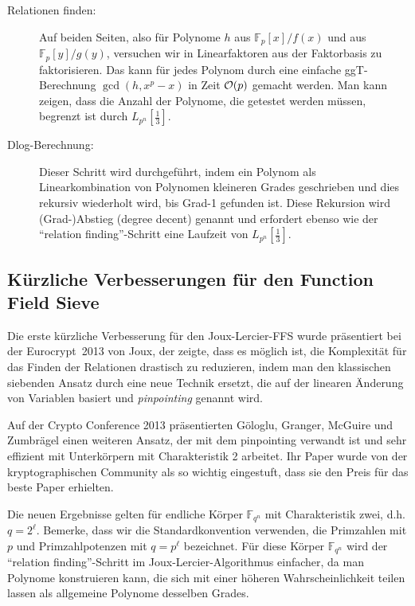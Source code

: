 \begin{refsegment}
\begin{description}
\item[Relationen finden:] Auf beiden Seiten, also für Polynome $h$ aus $\mathbb{F}_p[x]/f(x)$ und aus $\mathbb{F}_p[y]/g(y)$, versuchen wir in Linearfaktoren aus der Faktorbasis zu faktorisieren. Das kann für jedes Polynom durch eine einfache ggT-Berechnung $\gcd(h, x^p-x)$ in Zeit ${\cal O}(p)$ gemacht werden. Man kann zeigen, dass die Anzahl der Polynome, die getestet werden müssen, begrenzt ist durch $L_{p^n}[\frac 1 3]$.
\item[Dlog-Berechnung:] Dieser Schritt wird durchgeführt, indem ein Polynom als Linearkombination von Polynomen kleineren Grades geschrieben und dies rekursiv wiederholt wird, bis Grad-1 gefunden ist. Diese Rekursion wird (Grad-)Abstieg (degree decent) genannt und erfordert ebenso wie der "`relation finding"'-Schritt eine Laufzeit von $L_{p^n}[\frac 1 3]$.
\end{description}


\subsection{Kürzliche Verbesserungen für den Function Field Sieve}
\label{GGMZ}

Die erste kürzliche Verbesserung für den Joux-Lercier-FFS wurde präsentiert bei der Eurocrypt~2013 von Joux, der zeigte, dass es möglich ist, die Komplexität für das Finden der Relationen drastisch zu reduzieren, indem man den klassischen siebenden Ansatz durch eine neue Technik ersetzt, die auf der linearen Änderung von Variablen basiert und {\it pinpointing} genannt wird.

\DIFaddend Auf der Crypto Conference 2013 präsentierten G\"ologlu, Granger, McGuire und Zumbr\"agel einen weiteren Ansatz, der mit dem pinpointing verwandt ist und sehr effizient mit Unterkörpern mit Charakteristik 2 arbeitet. Ihr Paper wurde von der kryptographischen Community als so wichtig eingestuft, dass sie den Preis für das beste Paper erhielten.

Die neuen Ergebnisse gelten für endliche Körper $\mathbb{F}_{q^n}$ mit Charakteristik zwei, d.h. $q=2^{\ell}$. Bemerke, dass wir die Standardkonvention verwenden, die Primzahlen mit $p$ und Primzahlpotenzen mit $q=p^{\ell}$ bezeichnet.
Für diese Körper $\mathbb{F}_{q^n}$ wird der "`relation finding"'-Schritt im Joux-Lercier-Algorithmus einfacher, da man Polynome konstruieren kann, die sich mit einer höheren Wahrscheinlichkeit teilen lassen als allgemeine Polynome desselben Grades.


\end{refsegment}
